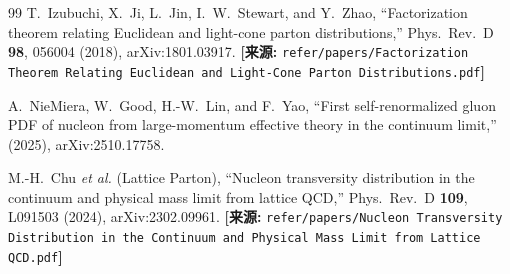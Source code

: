 \documentclass[12pt,a4paper]{ctexart}
\theoremstyle{definition}
\begin{document}
\begin{thebibliography}{99}
T.~Izubuchi, X.~Ji, L.~Jin, I.~W.~Stewart, and Y.~Zhao,
``Factorization theorem relating Euclidean and light-cone parton distributions,''
Phys.\ Rev.\ D \textbf{98}, 056004 (2018), arXiv:1801.03917.
\quad\textbf{[来源:} \texttt{refer/papers/Factorization Theorem Relating Euclidean and Light-Cone Parton Distributions.pdf}\textbf{]}

A.~NieMiera, W.~Good, H.-W.~Lin, and F.~Yao,
``First self-renormalized gluon PDF of nucleon from large-momentum effective theory in the continuum limit,''
(2025), arXiv:2510.17758.

M.-H.~Chu \textit{et al.} (Lattice Parton),
``Nucleon transversity distribution in the continuum and physical mass limit from lattice QCD,''
Phys.\ Rev.\ D \textbf{109}, L091503 (2024), arXiv:2302.09961.
\quad\textbf{[来源:} \texttt{refer/papers/Nucleon Transversity Distribution in the Continuum and Physical Mass Limit from Lattice QCD.pdf}\textbf{]}

\end{thebibliography}
\end{document}
